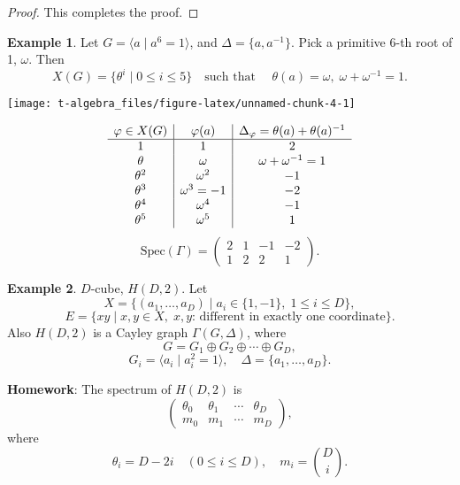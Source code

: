 \documentclass[
]{book}
\theoremstyle{definition}
\theoremstyle{definition}
\newtheorem{example}{Example}[chapter]
\theoremstyle{definition}
\theoremstyle{definition}
\theoremstyle{remark}
\begin{document}
\begin{proof}
This completes the proof.

\end{proof}

\begin{example}
\protect\hypertarget{exm:character-cyclic6}{}\label{exm:character-cyclic6}Let \(G = \langle a\mid a^6 = 1\rangle\), and \(\Delta = \{a, a^{-1}\}\). Pick a primitive 6-th root of 1, \(\omega\). Then
\[X(G) = \{\theta^i\mid 0\leq i\leq 5\} \quad \text{such that }\quad \theta(a) = \omega, \; \omega + \omega^{-1} = 1.\]

\begin{center}\texttt{[image: t-algebra\_files/figure-latex/unnamed-chunk-4-1]} \end{center}

\[\begin{array}{c | c | c}
\varphi\in X(G) & \varphi(a) & \Delta_\varphi = \theta(a) + \theta(a)^{-1}\\
\hline
1 & 1 & 2\\
\theta & \omega & \omega+\omega^{-1} = 1\\
\theta^2 & \omega^2 & -1\\
\theta^3 & \omega^3 = -1 & -2\\
\theta^4 & \omega^4 & -1\\
\theta^5 & \omega^5 & 1
\end{array}\]
\[\text{Spec}(\Gamma) = \begin{pmatrix} 2 & 1 & -1 & -2\\ 1 & 2 & 2 & 1\end{pmatrix}.\]
\end{example}

\begin{example}
\protect\hypertarget{exm:hd2}{}\label{exm:hd2}\(D\)-cube, \(H(D,2)\). Let
\[X = \{(a_1, \ldots, a_D)\mid a_i\in \{1,-1\}, \; 1\leq i\leq D\},\]
\[E = \{xy\mid x, y\in X, \; x, y \text{: different in exactly one coordinate}\}.\]
Also \(H(D,2)\) is a Cayley graph \(\Gamma(G, \Delta)\), where
\[G = G_1\oplus G_2 \oplus \cdots \oplus G_D, \]
\[G_i = \langle a_i\mid a_i^2  = 1\rangle,\quad \Delta = \{a_1, \ldots, a_D\}.\]
\end{example}

\textbf{Homework}: The spectrum of \(H(D,2)\) is
\[\begin{pmatrix} \theta_0 & \theta_1 & \cdots & \theta_D\\
m_0 & m_1 & \cdots & m_D\end{pmatrix},\]
where
\[\theta_i = D-2i \quad (0\leq i\leq D), \quad m_i = \binom{D}{i}.\]
\end{document}
